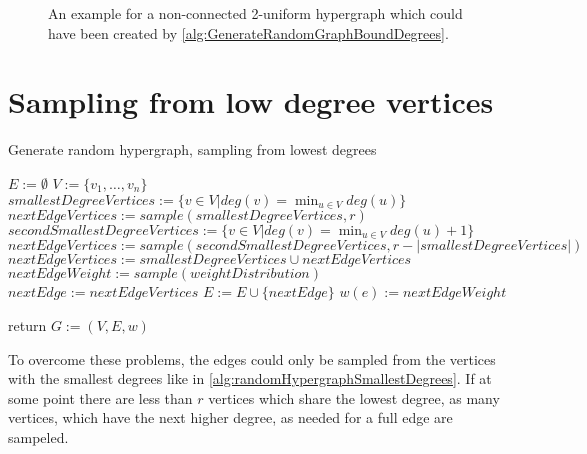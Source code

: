 \begin{figure} 
	\centering
	\caption[Example non-connected uniform hypergraph]{An example for a non-connected 2-uniform hypergraph which could have been created by \cref{alg:GenerateRandomGraphBoundDegrees}. }\label{fig:exapmle_non_connected_uniform_hypergraph}
\end{figure}


\section{Sampling from low degree vertices}
\begin{algorithm}
	\caption{Generate random hypergraph, sampling from lowest degrees\label{alg:randomHypergraphSmallestDegrees}} 
	\begin{algorithmic}
		\State $E := \emptyset$
		\State $V := \{v_1, \ldots, v_n\}$
		\State $ smallestDegreeVertices := \{v\in V| deg(v) = \min_{u\in V} deg(u) \}$
		\State $nextEdgeVertices := sample(smallestDegreeVertices, r) $ 
		\Else 
		\State $secondSmallestDegreeVertices := \{v\in V| deg(v) = \min_{u\in V} deg(u) +1 \}$
		\State $nextEdgeVertices :=  sample(secondSmallestDegreeVertices, r - | smallestDegreeVertices|)$
		\State $nextEdgeVertices := smallestDegreeVertices \cup nextEdgeVertices  $
		\EndIf
		\State $nextEdgeWeight := sample(weightDistribution)$ 
		\State $nextEdge := nextEdgeVertices$
		\State $E := E \cup \{nextEdge\}$
		\State $w(e):= nextEdgeWeight$
		
		\EndWhile
		\State return $G:=(V,E, w)$	
		\EndFunction 
	\end{algorithmic}
\end{algorithm}	
To overcome these problems, the edges could only be sampled from the vertices with the smallest degrees like in \cref{alg:randomHypergraphSmallestDegrees}. If at some point there are less than $r$ vertices which share the lowest degree, as many vertices, which have the next higher degree, as needed for a full edge are sampeled.

